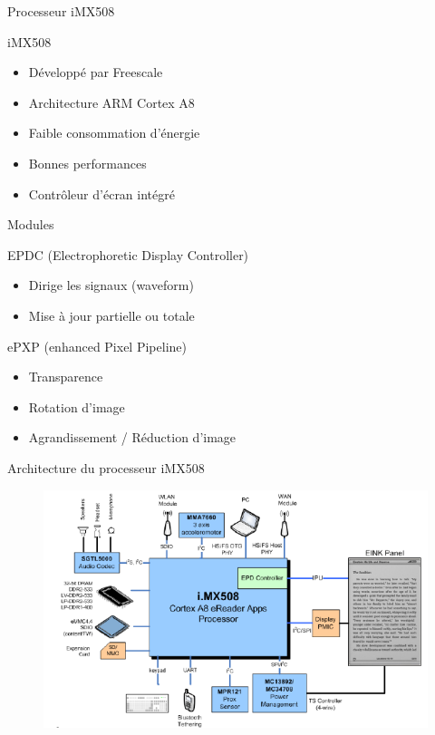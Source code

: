 \begin{frame}{Processeur iMX508} %
	\begin{block}{iMX508}
	\begin{itemize}
		\item{Développé par Freescale}
		\item{Architecture ARM Cortex A8}
		\item{Faible consommation d'énergie}
		\item{Bonnes performances}
		\item{Contrôleur d'écran intégré}
	\end{itemize}
	\end{block}
\end{frame}

\begin{frame}{Modules}
	\begin{block}{EPDC (Electrophoretic Display Controller)}
		\begin{itemize}
			\item{Dirige les signaux (waveform)}
			\item{Mise à jour partielle ou totale}
		\end{itemize}
	\end{block}
	\begin{block}{ePXP (enhanced Pixel Pipeline)}
		\begin{itemize}
			\item Transparence
			\item Rotation d'image
			\item Agrandissement / Réduction d'image
		\end{itemize}
	\end{block}
\end{frame}

\begin{frame}{Architecture du processeur iMX508} %
	\begin{figure}
		\begin{center}
			\includegraphics[scale=0.65]{iMX508.png}
		\end{center}
	\end{figure}
\end{frame}


